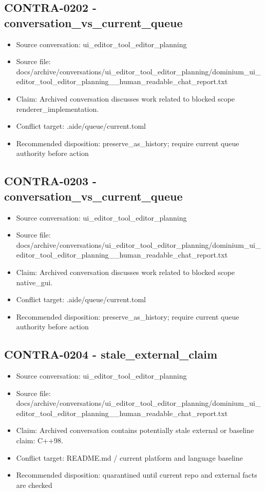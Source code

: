 \documentclass[11pt,a4paper]{report}
\begin{document}
\subsection{CONTRA-0202 - conversation\_vs\_current\_queue}

\begin{itemize}
\item Source conversation: ui\_editor\_tool\_editor\_planning
\item Source file: docs/archive/conversations/ui\_editor\_tool\_editor\_planning/dominium\_ui\_editor\_tool\_editor\_planning\_\_human\_readable\_chat\_report.txt
\item Claim: Archived conversation discusses work related to blocked scope renderer\_implementation.
\item Conflict target: .aide/queue/current.toml
\item Recommended disposition: preserve\_as\_history; require current queue authority before action
\end{itemize}

\subsection{CONTRA-0203 - conversation\_vs\_current\_queue}

\begin{itemize}
\item Source conversation: ui\_editor\_tool\_editor\_planning
\item Source file: docs/archive/conversations/ui\_editor\_tool\_editor\_planning/dominium\_ui\_editor\_tool\_editor\_planning\_\_human\_readable\_chat\_report.txt
\item Claim: Archived conversation discusses work related to blocked scope native\_gui.
\item Conflict target: .aide/queue/current.toml
\item Recommended disposition: preserve\_as\_history; require current queue authority before action
\end{itemize}

\subsection{CONTRA-0204 - stale\_external\_claim}

\begin{itemize}
\item Source conversation: ui\_editor\_tool\_editor\_planning
\item Source file: docs/archive/conversations/ui\_editor\_tool\_editor\_planning/dominium\_ui\_editor\_tool\_editor\_planning\_\_human\_readable\_chat\_report.txt
\item Claim: Archived conversation contains potentially stale external or baseline claim: C++98.
\item Conflict target: README.md / current platform and language baseline
\item Recommended disposition: quarantined until current repo and external facts are checked
\end{itemize}
\end{document}
